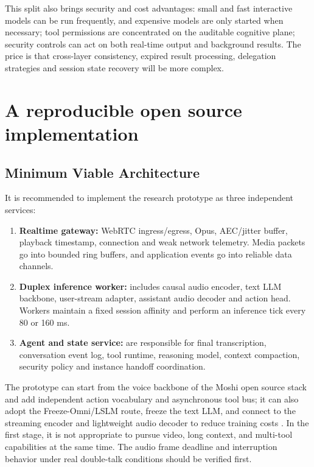 \documentclass[UTF8,fontset=none,a4paper,10pt]{ctexart}
\begin{document}
This split also brings security and cost advantages: small and fast interactive models can be run frequently, and expensive models are only started when necessary; tool permissions are concentrated on the auditable cognitive plane; security controls can act on both real-time output and background results. The price is that cross-layer consistency, expired result processing, delegation strategies and session state recovery will be more complex.

\section{A reproducible open source implementation}

\subsection{Minimum Viable Architecture}

It is recommended to implement the research prototype as three independent services:

\begin{enumerate}
\item \textbf{Realtime gateway: }WebRTC ingress/egress, Opus, AEC/jitter buffer, playback timestamp, connection and weak network telemetry. Media packets go into bounded ring buffers, and application events go into reliable data channels.
\item \textbf{Duplex inference worker: } includes causal audio encoder, text LLM backbone, user-stream adapter, assistant audio decoder and action head. Workers maintain a fixed session affinity and perform an inference tick every 80 or 160 ms.
\item \textbf{Agent and state service: } are responsible for final transcription, conversation event log, tool runtime, reasoning model, context compaction, security policy and instance handoff coordination.
\end{enumerate}

The prototype can start from the voice backbone of the Moshi open source stack \cite{defossez2024moshi} and add independent action vocabulary and asynchronous tool bus; it can also adopt the Freeze-Omni/LSLM route, freeze the text LLM, and connect to the streaming encoder and lightweight audio decoder to reduce training costs \cite{wang2024freezeomni,ma2025lslm}. In the first stage, it is not appropriate to pursue video, long context, and multi-tool capabilities at the same time. The audio frame deadline and interruption behavior under real double-talk conditions should be verified first.
\end{document}
